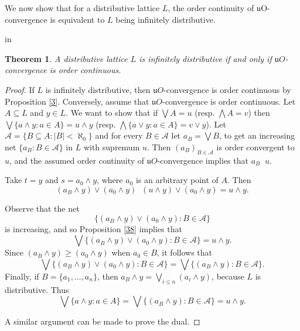 \documentclass[12pt,a4paper]{amsart}
\numberwithin{equation}{section}
\newtheorem{thm}{Theorem}
\theoremstyle{definition}
\newcommand{\converges}[1]{\mathop{\overset{\text{#1}}{\longrightarrow}}}
\newcommand{\aaa}{\mathscr A}
\begin{document}
We now show that for a distributive lattice $L$, the order continuity of $\mathfrak{u}$O-convergence is equivalent to $L$ being infinitely distributive.



 in

\begin{thm}\label{4}
	A distributive lattice $L$ is infinitely distributive if and only if  $\mathfrak{u}O$-convergence is order continuous.
\end{thm}
\begin{proof}
	If $L$ is infinitely distributive, then $\mathfrak{u}O$-convergence is order continuous by Proposition \ref{3}. Conversely, assume that $\mathfrak{u}O$-convergence is order continuous. Let $A \subseteq L$  and $y\in L$. We want to show that if $\bigvee A=u$ (resp. $\bigwedge A=v$) then $\bigvee \{a \wedge y : a \in A\} = u \wedge y$ (resp. $\bigwedge \{a\vee y:a\in A\} = v\vee y$). 
 Let $\aaa=\{B \subseteq A : \vert B \vert < \aleph_0\}$ and for every $B\in\aaa$ let $a_{B} = \bigvee B$, to get an increasing net $\{a_{B} : B \in \aaa\}$ in $L$ with supremum $u$. 
 Then $(a_B)_{B\in\aaa}$ is order convergent to $u$, and the assumed order continuity of $\mathfrak{u}O$-convergence implies that $a_{B} \converges{{$\mathfrak{u}\mbox{O}$}} u$. 
 
 Take $t = y$ and $s = a_0 \wedge y$, where $a_0$ is an arbitrary point of $A$.  Then
 \[(a_{B} \wedge y) \vee (a_0\wedge y) \converges{O} (u \wedge y)\vee(a_0\wedge y)=u\wedge y.\] 
 
 Observe that the net 
 \[\{(a_{B} \wedge y) \vee (a_0\wedge y):B\in\aaa\}\]
 is increasing, and so Proposition \ref{38} implies that 
 \[\bigvee\{(a_{B} \wedge y) \vee (a_0\wedge y):B\in\aaa\}=u\wedge y.\]
 Since $(a_{B} \wedge y) \ge (a_0\wedge y)$ when $a_0\in B$, it follows that 
 \[\bigvee\{(a_{B} \wedge y) \vee (a_0\wedge y):B\in\aaa\}=\bigvee\{(a_{B} \wedge y):B\in\aaa\}.\]
 Finally, if $B=\{a_1,\dots,a_n\}$, then $a_B\wedge y=\bigvee_{i\le n}(a_i\wedge y)$, because $L$ is distributive.  Thus 
 \[\bigvee \{a \wedge y : a \in A\}=\bigvee\{(a_{B} \wedge y):B\in\aaa\}=u\wedge y.\]
 
A similar argument can be made to prove the dual.
\end{proof}	
\end{document}
